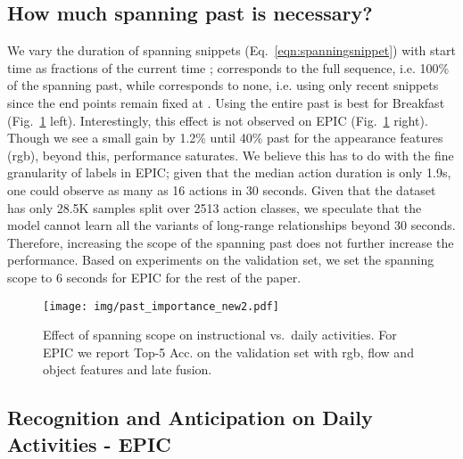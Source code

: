 \documentclass[runningheads]{llncs}
\makeatletter
\newcommand*{\ie}{i.e.\@\xspace}
\makeatother
\begin{document}
\subsection{How much spanning past is necessary?}\label{sec:spanning_past_inf}
We vary the duration of spanning snippets (Eq.~\ref{eqn:spanningsnippet}) with start time  as fractions of the current time ;  corresponds to the full sequence, \ie 100\% of the spanning past, while  corresponds to none, \ie using only recent snippets since the end points  remain fixed at . Using the entire past is best for Breakfast (Fig.~\ref{fig:pastImportance} left). Interestingly, this effect is not observed on EPIC (Fig.~\ref{fig:pastImportance} right). Though we see a small gain by 1.2\% until 40\% past for the appearance features (rgb), beyond this, performance saturates. We believe this has to do with the fine granularity of labels in EPIC; given that the median action duration is only 1.9s, one could observe as many as 16 actions in 30 seconds. Given that the dataset has only 28.5K samples split over 2513 action classes, we speculate that the model cannot learn all the variants of long-range relationships beyond 30 seconds. Therefore, increasing the scope of the spanning past does not further increase the performance. Based on experiments on the validation set, we set the spanning scope to 6 seconds for EPIC for the rest of the paper.   

\begin{figure}[t]
\centering 
\texttt{[image: img/past\_importance\_new2.pdf]}
\caption{Effect of spanning scope on instructional vs.\ daily activities. For EPIC  we report Top-5 Acc. on the validation set with rgb, flow and object features and late fusion.}
\label{fig:pastImportance}
\end{figure}


\subsection{Recognition and Anticipation on Daily Activities - EPIC}\label{sec:daily_act}
\end{document}

